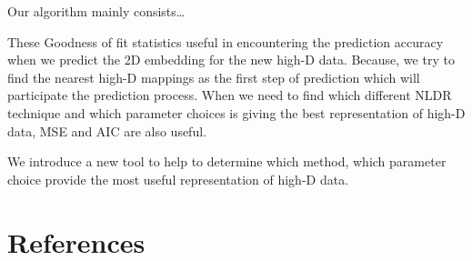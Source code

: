 \documentclass[
  12pt]{article}
\begin{document}
Our algorithm mainly consists\ldots{}

These Goodness of fit statistics useful in encountering the prediction
accuracy when we predict the 2D embedding for the new high-D data.
Because, we try to find the nearest high-D mappings as the first step of
prediction which will participate the prediction process. When we need
to find which different NLDR technique and which parameter choices is
giving the best representation of high-D data, MSE and AIC are also
useful.

We introduce a new tool to help to determine which method, which
parameter choice provide the most useful representation of high-D data.

\hypertarget{references}{%
\section*{References}\label{references}}

\renewcommand{\bibsection}{}


\newpage{}
\end{document}
